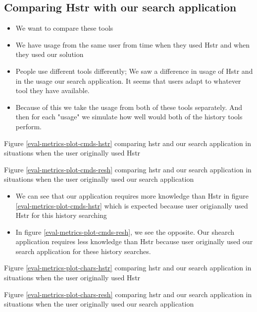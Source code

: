 \subsection{Comparing Hstr with our search application}




\begin{itemize}
    \item We want to compare these tools
    \item We have usage from the same user from time when they used Hstr and when they used our solution
    \item People use different tools differently; We saw a difference in usage of Hstr and in the usage our search application. It seems that users adapt to whatever tool they have available.
    \item Because of this we take the usage from both of these tools separately. And then for each "usage" we simulate how well would both of the history tools perform.
\end{itemize}




Figure \ref{eval-metrics-plot-cmds-hstr} comparing hstr and our search application in situations when the user originally used Hstr

Figure \ref{eval-metrics-plot-cmds-resh} comparing hstr and our search application in situations when the user originally used our search application

\begin{itemize}
    \item We can see that our application requires more knowledge than Hstr in figure \ref{eval-metrics-plot-cmds-hstr} which is expected because user origianally used Hstr for this history searching
    \item In figure \ref{eval-metrics-plot-cmds-resh}, we see the opposite. Our shearch application requires less knowledge than Hstr because user originally used our search application for these history searches.
\end{itemize}


Figure \ref{eval-metrics-plot-chars-hstr} comparing hstr and our search application in situations when the user originally used Hstr


Figure \ref{eval-metrics-plot-chars-resh} comparing hstr and our search application in situations when the user originally used our search application


